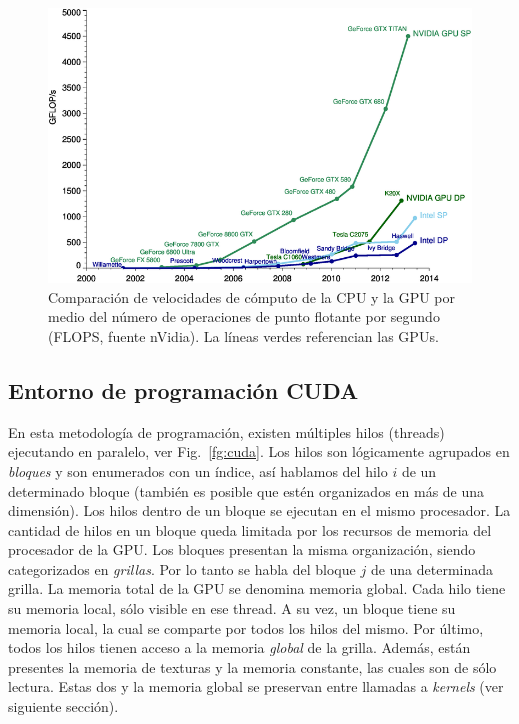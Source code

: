 \begin{figure}[h]
\begin{center}
\includegraphics[width=12cm]{figures/cpugpu}
\end{center}
\caption[Comparación de velocidades de cómputo de la CPU y la GPU]{Comparación de velocidades de cómputo de la CPU y la GPU por medio del número de operaciones de punto flotante por segundo (FLOPS, fuente nVidia). La líneas verdes referencian las GPUs.}
\label{fg:cpugpu}
\end{figure}



\subsection{Entorno de programación CUDA}
En esta metodolog\'ia de programaci\'on, existen m\'ultiples hilos (threads) ejecutando en paralelo, ver Fig.~\ref{fg:cuda}.
Los hilos son l\'ogicamente agrupados en {\em bloques} y son enumerados con un \'indice, as\'i hablamos del hilo $i$ de un determinado bloque (también es posible que estén organizados en más de una dimensión).
Los hilos dentro de un bloque se ejecutan en el mismo procesador.
La cantidad de hilos en un bloque queda limitada por los recursos de memoria del procesador de la GPU. Los bloques presentan la misma organizaci\'on, siendo categorizados en {\em grillas}. 
Por lo tanto se habla del bloque $j$ de una determinada grilla.
La memoria total de la GPU se denomina memoria global. Cada hilo tiene su memoria local, s\'olo visible en ese thread.
A su vez, un bloque tiene su memoria local, la cual se comparte por todos los hilos del mismo.
Por \'ultimo, todos los hilos tienen acceso a la memoria {\em global} de la grilla.
Adem\'as, est\'an presentes la memoria de texturas y la memoria constante, las cuales son de s\'olo lectura.
Estas dos y la memoria global se preservan entre llamadas a {\em kernels} (ver siguiente secci\'on).

